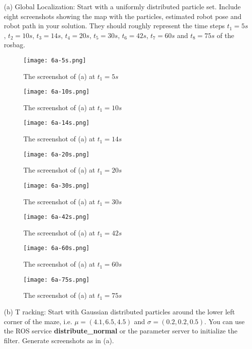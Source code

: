 \documentclass[a4paper,10pt]{article}
\begin{document}
(a) Global Localization: Start with a uniformly distributed particle set. Include eight screenshots showing the map with the particles, estimated robot pose and robot path in your solution. They should roughly represent the time steps $t_{1} = 5s$, $t_{2} = 10s$, $t_{3} = 14s$, $t_{4} = 20s$, $t_{5} = 30s$, $t_{6} = 42s$, $t_{7} = 60s$ and $t_{8} = 75s$ of the rosbag.

\begin{figure}[H]
	\centering
	\texttt{[image: 6a-5s.png]}
	\caption{The screenshot of (a) at $t_{1} = 5s$}
\end{figure}

\begin{figure}[H]
	\centering
	\texttt{[image: 6a-10s.png]}
	\caption{The screenshot of (a) at $t_{1} = 10s$}
\end{figure}

\begin{figure}[H]
	\centering
	\texttt{[image: 6a-14s.png]}
	\caption{The screenshot of (a) at $t_{1} = 14s$}
\end{figure}

\begin{figure}[H]
	\centering
	\texttt{[image: 6a-20s.png]}
	\caption{The screenshot of (a) at $t_{1} = 20s$}
\end{figure}

\begin{figure}[H]
	\centering
	\texttt{[image: 6a-30s.png]}
	\caption{The screenshot of (a) at $t_{1} = 30s$}
\end{figure}

\begin{figure}[H]
	\centering
	\texttt{[image: 6a-42s.png]}
	\caption{The screenshot of (a) at $t_{1} = 42s$}
\end{figure}

\begin{figure}[H]
	\centering
	\texttt{[image: 6a-60s.png]}
	\caption{The screenshot of (a) at $t_{1} = 60s$}
\end{figure}

\begin{figure}[H]
	\centering
	\texttt{[image: 6a-75s.png]}
	\caption{The screenshot of (a) at $t_{1} = 75s$}
\end{figure}

(b) T racking: Start with Gaussian distributed particles around the lower left corner of the maze, i.e. $\mu = (4.1, 6.5, 4.5)$ and $\sigma  = (0.2, 0.2, 0.5)$. You can use the ROS service \textbf{distribute\_normal} or the parameter server to initialize the filter. Generate screenshots as in (a).
\end{document}

